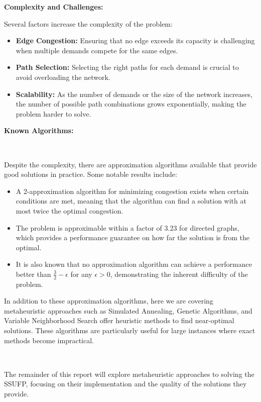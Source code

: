 \documentclass[a4paper,12pt]{article}
\begin{document}
\noindent \textbf{Complexity and Challenges:}

\noindent Several factors increase the complexity of the problem:

\begin{itemize}
    \item \textbf{Edge Congestion:} Ensuring that no edge exceeds its capacity is challenging when multiple demands compete for the same edges.
    \item \textbf{Path Selection:} Selecting the right paths for each demand is crucial to avoid overloading the network.
    \item \textbf{Scalability:} As the number of demands or the size of the network increases, the number of possible path combinations grows exponentially, making the problem harder to solve.
\end{itemize}

\noindent \textbf{Known Algorithms:}

\

\noindent Despite the complexity, there are approximation algorithms available that provide good solutions in practice. Some notable results include:
\begin{itemize}
    \item A 2-approximation algorithm for minimizing congestion exists when certain conditions are met, meaning that the algorithm can find a solution with at most twice the optimal congestion.
    \item The problem is approximable within a factor of 3.23 for directed graphs, which provides a performance guarantee on how far the solution is from the optimal.
    \item It is also known that no approximation algorithm can achieve a performance better than \( \frac{3}{2} - \epsilon \) for any $\epsilon > 0$, demonstrating the inherent difficulty of the problem.
\end{itemize}

\noindent In addition to these approximation algorithms, here we are covering metaheuristic approaches such as Simulated Annealing, Genetic Algorithms, and Variable Neighborhood Search offer heuristic methods to find near-optimal solutions. These algorithms are particularly useful for large instances where exact methods become impractical.

\

\noindent The remainder of this report will explore metaheuristic approaches to solving the SSUFP, focusing on their implementation and the quality of the solutions they provide.
\end{document}
